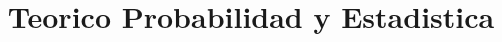 \documentclass[]{article}
\begin{document}
\newcommand{\ida}{\Longrightarrow}
\newcommand{\vuelta}{\Longleftarrow}
\newcommand{\cn}[1]{\text{$\mathbb{#1}$}}
\newcommand{\mtx}[2]{\text{$\mathbb{K}^{#1 \times #2}$}}
\newcommand{\incluye}[2]{\text{$#1 \subseteq #2$}}
\newcommand{\conjunto}[1]{\text{$\{ {#1} \}$}}
\newcommand{\tq}{\text{ $|$ }}
\newcommand{\novacio}{\text{$\neq\emptyset$}\:}

\title{Teorico Probabilidad y Estadistica}
\maketitle
\end{document}
